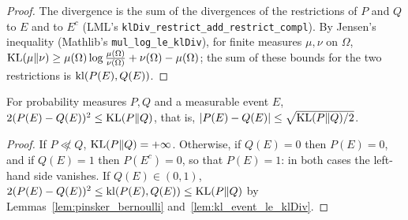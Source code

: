 \begin{proof}
  \leanok
  The divergence is the sum of the divergences of the restrictions of $P$ and $Q$ to $E$ and to
  $E^c$ (LML's \texttt{klDiv\_restrict\_add\_restrict\_compl}). By Jensen's inequality (Mathlib's
  \texttt{mul\_log\_le\_klDiv}), for finite measures $\mu, \nu$ on $\Omega$,
  $\mathrm{KL}(\mu \| \nu) \ge \mu(\Omega) \log\frac{\mu(\Omega)}{\nu(\Omega)} + \nu(\Omega) - \mu(\Omega)$;
  the sum of these bounds for the two restrictions is $\mathrm{kl}(P(E), Q(E))$.
\end{proof}

\begin{lemma}
  \label{lem:pinsker_event}
  \leanok
  For probability measures $P, Q$ and a measurable event $E$,
  $2 (P(E) - Q(E))^2 \le \mathrm{KL}(P \| Q)$, that is, $\lvert P(E) - Q(E) \rvert \le \sqrt{\mathrm{KL}(P \| Q)/2}$.
\end{lemma}

\begin{proof}
  \leanok
  If $P \not\ll Q$, $\mathrm{KL}(P \| Q) = +\infty$. Otherwise, if $Q(E) = 0$ then $P(E) = 0$, and if
  $Q(E) = 1$ then $P(E^c) = 0$, so that $P(E) = 1$: in both cases the left-hand side vanishes. If
  $Q(E) \in (0, 1)$, $2 (P(E) - Q(E))^2 \le \mathrm{kl}(P(E), Q(E)) \le \mathrm{KL}(P \| Q)$ by
  Lemmas~\ref{lem:pinsker_bernoulli} and~\ref{lem:kl_event_le_klDiv}.
\end{proof}
